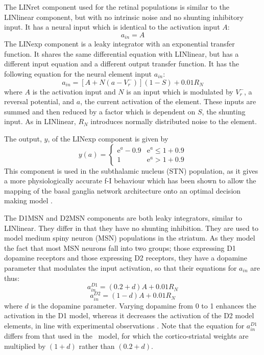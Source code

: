 \documentclass{frontiersSCNS}
\begin{document}
The LINret component used for the retinal populations is similar to
the LINlinear component, but with no intrinsic noise and no shunting
inhibitory input. It has a neural input which is identical to the
activation input $A$:
\begin{equation}
   a_{in} = A
\end{equation}
The LINexp component is a leaky integrator with an exponential
transfer function. It shares the same differential equation with
LINlinear, but has a different input equation and a different output
transfer function. It has the following equation for the neural
element input $a_{in}$:
\begin{equation}
   a_{in} = [A+N(a-V_{r}^{-})] (1-S) + 0.01 R_N
\end{equation}
where $A$ is the activation input and $N$ is an input which is
modulated by $V_{r}^{-}$, a reversal potential, and $a$, the current
activation of the element. These inputs are summed and then reduced by
a factor which is dependent on $S$, the shunting input. As in
LINlinear, $R_N$ introduces normally distributed noise to the element.

The output, $y$, of the LINexp component is given by
\begin{equation}
   y(a) = \begin{cases}
      \mathrm{e}^{a}-0.9   & \mathrm{e}^a \leq 1+0.9 \\
      1   & \mathrm{e}^a > 1+0.9
   \end{cases}
\end{equation}
This component is used in the subthalamic nucleus (STN) population, as
it gives a more physiologically accurate f-I
behaviour
\citep{wilson_model_2004,bevan_mechanisms_1999,hallworth_apamin-sensitive_2003}
which has been shown to allow the mapping of the basal ganglia network
architecture onto an optimal decision making
model \citep{bogacz_basal_2007}.

The D1MSN and D2MSN components are both leaky integrators, similar to
LINlinear. They differ in that they have no shunting inhibition. They
are used to model medium spiny neuron (MSN) populations in the
striatum. As they model the fact that most MSN neurons fall into two
groups; those expressing D1 dopamine receptors and those expressing D2
receptors, they have a dopamine parameter that modulates the input
activation, so that their equations for $a_{in}$ are thus:
\begin{equation} \label{eq:a_in_d1}
   a_{in}^{D1} = (0.2 + d)A + 0.01 R_N
\end{equation}
\begin{equation} \label{eq:a_in_d2}
   a_{in}^{D2} = (1 - d)A + 0.01 R_N
\end{equation}
where $d$ is the dopamine parameter. Varying dopamine from 0 to 1
enhances the activation in the D1 model, whereas it decreases the
activation of the D2 model elements, in line with experimental
observations \citep{harsing_influence_1997,gonon_prolonged_1997}.
Note that the equation for $a_{in}^{D1}$ differs from that used in
the \ccg~model, for which the cortico-striatal weights are multiplied
by $(1+d)$ rather than $(0.2+d)$.
\end{document}
